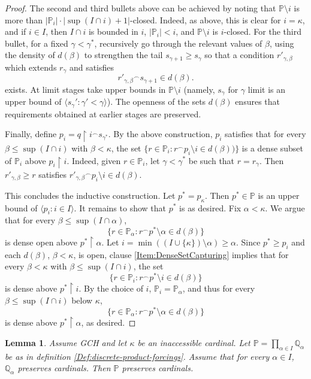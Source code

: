 \documentclass{article}
\theoremstyle{definition}
\theoremstyle{plain}
\newtheorem{lemma}[definition]{Lemma}
\newcommand{\po}{\mathbb{P}}
\newcommand{\qo}{\mathbb{Q}}
\newcommand{\la}{\langle}
\newcommand{\ra}{\rangle}
\newcommand{\uhr}{\upharpoonright}
\begin{document}
\begin{proof}
    The second and third bullets above can be achieved by noting that $\po\setminus i$ is more than $|\po_i|\cdot|\sup(I\cap i)+1|$-closed. Indeed, as above, this is clear for $i=\kappa$, and if $i\in I$, then $I\cap i$ is bounded in $i$, $|\po_i|<i$, and $\po\setminus i$ is $i$-closed. For the third bullet, for a fixed $\gamma<\gamma^*$, recursively go through the relevant values of $\beta$, using the density of $d(\beta)$ to strengthen the tail $s_{\gamma+1}\geq s_{\gamma}$ so that a condition $r'_{\gamma,\beta}$ which extends $r_\gamma$ and satisfies 
    $$ r'_{\gamma, \beta}{}^\frown s_{\gamma+1}\in d(\beta). $$
    exists. At limit stages take upper bounds in $\po\setminus i$  (namely, $s_\gamma$ for $\gamma$ limit is an upper bound of $\la s_\gamma' \colon  \gamma'<\gamma\ra$). The openness of the sets $d(\beta)$ ensures that requirements obtained at earlier stages are preserved.



    
    Finally, define $p_i = q\uhr i {}^\frown s_{\gamma^*}$. By the above construction, $p_i$ satisfies that for every $\beta\leq \sup(I\cap i)$ with $\beta<\kappa$, the set $\{r\in \po_{i} \colon r{}^\frown p_i\setminus i\in d(\beta))  \}$ is a dense subset of $\po_i$ above $p_i\uhr i$. Indeed, given $r\in \po_i$, let $\gamma<\gamma^*$ be such that $r = r_\gamma$. Then $r'_{\gamma,\beta}\geq r$ satisfies $r'_{\gamma,\beta}{}^\frown p_i\setminus i\in d(\beta)$.

    
    This concludes the inductive construction. Let $p^* = p_\kappa$. Then $p^*\in \po$ is an upper bound of $\la p_i \colon i\in I \ra$. It remains to show that $p^*$ is as desired. Fix $\alpha<\kappa$. We argue that for every $\beta\leq\sup(I\cap \alpha)$,
    $$ \{ r\in \po_{\alpha} \colon  r{}^\frown p^*\setminus \alpha\in d(\beta) \}$$
    is dense open above $p^*\uhr \alpha$. Let $i = \min((I\cup \{\kappa\})\setminus \alpha)\geq \alpha$. Since $p^*\geq p_i$ and each $d(\beta)$, $\beta<\kappa$, is open, clause \ref{Item:DenseSetCapturing} implies that for every $\beta<\kappa$ with $\beta\leq\sup(I\cap i)$, the set
    $$ \{ r\in \po_{i} \colon  r{}^\frown p^*\setminus i\in d(\beta) \}$$
    is dense above $p^*\uhr i$. By the choice of $i$, $\po_i = \po_\alpha$, and thus for every $\beta\leq\sup(I\cap i)$ below $\kappa$,
    $$ \{ r\in \po_{\alpha} \colon  r{}^\frown p^*\setminus \alpha\in d(\beta) \} $$
    is dense above $p^*\uhr \alpha$, as desired.
\end{proof}

\begin{lemma}\label{Lem:PreservingCardinals}
    Assume {\rm GCH} and let $\kappa$ be an inaccessible cardinal. Let $\po = \prod_{\alpha\in I}\qo_\alpha$ be as in definition \ref{Def:discrete-product-forcings}. Assume that for every $\alpha\in I$, $\qo_\alpha$ preserves cardinals. Then $\po$ preserves cardinals.
\end{lemma}
\end{document}

